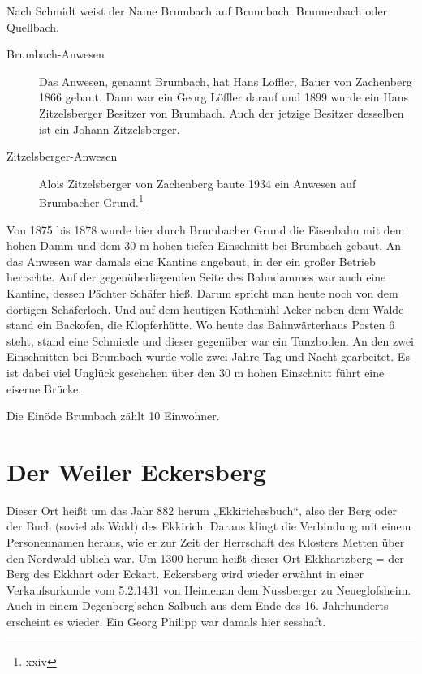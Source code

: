 \documentclass{book}
\begin{document}
Nach Schmidt weist der Name Brumbach auf Brunnbach, Brunnenbach oder
Quellbach.

\begin{description}
\item[Brumbach-Anwesen] Das Anwesen, genannt Brumbach, hat Hans Löffler,
Bauer von Zachenberg 1866 gebaut. Dann war ein Georg Löffler darauf und
1899 wurde ein Hans Zitzelsberger Besitzer von Brumbach. Auch der
jetzige Besitzer desselben ist ein Johann Zitzelsberger.

\item[Zitzelsberger-Anwesen] Alois Zitzelsberger von Zachenberg baute
1934 ein Anwesen auf Brumbacher Grund.\footnote{xxiv}
\end{description}

Von 1875 bis 1878 wurde hier durch Brumbacher Grund die Eisenbahn mit
dem hohen Damm und dem 30 m hohen tiefen Einschnitt bei Brumbach gebaut.
An das Anwesen war damals eine Kantine angebaut, in der ein großer
Betrieb herrschte. Auf der gegenüberliegenden Seite des Bahndammes war
auch eine Kantine, dessen Pächter Schäfer hieß. Darum spricht man heute
noch von dem dortigen Schäferloch. Und auf dem heutigen Kothmühl-Acker
neben dem Walde stand ein Backofen, die Klopferhütte. Wo heute das
Bahnwärterhaus Posten 6 steht, stand eine Schmiede und dieser gegenüber
war ein Tanzboden. An den zwei Einschnitten bei Brumbach wurde volle
zwei Jahre Tag und Nacht gearbeitet. Es ist dabei viel Unglück geschehen
über den 30 m hohen Einschnitt führt eine eiserne Brücke.

Die Einöde Brumbach zählt 10 Einwohner.

\section{Der Weiler Eckersberg}

Dieser Ort heißt um das Jahr 882 herum „Ekkirichesbuch“, also der Berg
oder der Buch (soviel als Wald) des Ekkirich. Daraus klingt die
Verbindung mit einem Personennamen heraus, wie er zur Zeit der
Herrschaft des Klosters Metten über den Nordwald üblich war. Um 1300
herum heißt dieser Ort Ekkhartzberg = der Berg des Ekkhart oder Eckart.
Eckersberg wird wieder erwähnt in einer Verkaufsurkunde vom 5.2.1431 von
Heimenan dem Nussberger zu Neueglofsheim. Auch in einem Degenberg'schen
Salbuch aus dem Ende des 16. Jahrhunderts erscheint es wieder. Ein Georg
Philipp war damals hier sesshaft.
\end{document}
